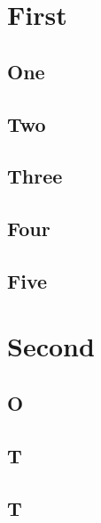 \documentclass[draft]{uoflthesis} %
\begin{document}
\tableofcontents


\listoffigures

\mainmatter

\chapter{First}

\section{One}

\lipsum[1-50]

\section{Two}

\lipsum

\section{Three}

\lipsum

\section{Four}

\lipsum

\section{Five}

\lipsum

\chapter{Second}

\section{O}

\lipsum

\section{T}

\lipsum

\section{T}
\end{document}
